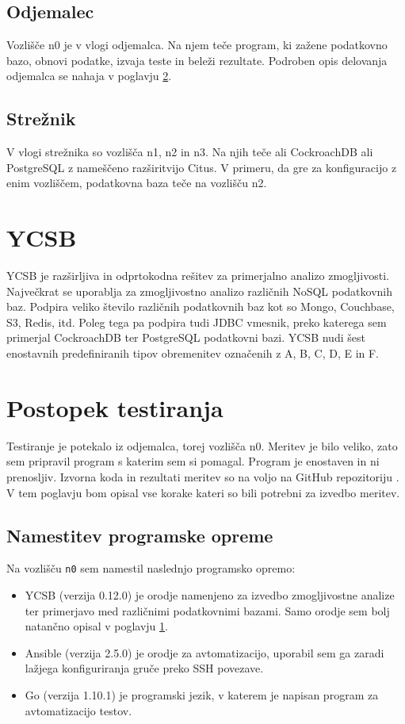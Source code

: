 \documentclass[a4paper, 12pt]{book}
\begin{document}
\subsection{Odjemalec}
Vozlišče n0 je v vlogi odjemalca. Na njem teče program, ki zažene podatkovno bazo, obnovi podatke, izvaja teste in beleži rezultate. Podroben opis delovanja odjemalca se nahaja v poglavju \ref{YCSB_benchmarking_steps}.

\subsection{Strežnik}
V vlogi strežnika so vozlišča n1, n2 in n3. Na njih teče ali CockroachDB ali PostgreSQL z nameščeno razširitvijo Citus. V primeru, da gre za konfiguracijo z enim vozliščem, podatkovna baza teče na vozlišču n2.

\section{YCSB}
\label{YCSB_about}
YCSB \cite{brianfrankcooper/YCSB} je razširljiva in odprtokodna rešitev za primerjalno analizo zmogljivosti. Največkrat se uporablja za zmogljivostno analizo različnih NoSQL podatkovnih baz. Podpira veliko število različnih podatkovnih baz kot so  Mongo, Couchbase, S3, Redis, itd. Poleg tega pa podpira tudi JDBC vmesnik, preko katerega sem primerjal CockroachDB ter PostgreSQL podatkovni bazi. YCSB nudi šest enostavnih predefiniranih tipov obremenitev \cite{YCSB-core-workloads} označenih z A, B, C, D, E in F.

\section{Postopek testiranja}
\label{YCSB_benchmarking_steps}
Testiranje je potekalo iz odjemalca, torej vozlišča n0. Meritev je bilo veliko, zato sem pripravil program s katerim sem si pomagal. Program je enostaven in ni prenosljiv. Izvorna koda in rezultati meritev so na voljo na GitHub repozitoriju \cite{matjazmav/diploma-ycsb}. V tem poglavju bom opisal vse korake kateri so bili potrebni za izvedbo meritev.

\subsection{Namestitev programske opreme}
Na vozlišču \texttt{n0} sem namestil naslednjo programsko opremo:
\begin{itemize}
    \item YCSB (verzija 0.12.0) \cite{brianfrankcooper/YCSB} je orodje namenjeno za izvedbo zmogljivostne analize ter primerjavo med različnimi podatkovnimi bazami. Samo orodje sem bolj natančno opisal v poglavju \ref{YCSB_about}.
    \item Ansible (verzija 2.5.0) \cite{Ansible} je orodje za avtomatizacijo, uporabil sem ga zaradi lažjega konfiguriranja gruče preko SSH povezave.
    \item Go (verzija 1.10.1) \cite{Golang} je programski jezik, v katerem je napisan program za avtomatizacijo testov.
\end{itemize} 
\end{document}
